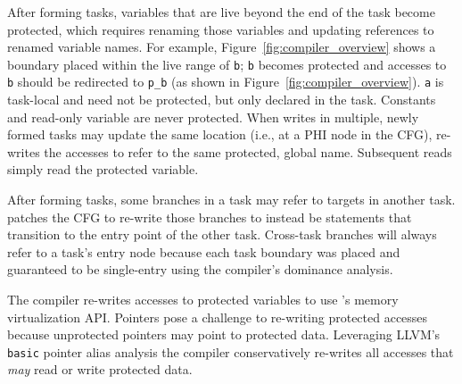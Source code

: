 After forming tasks, variables that are live beyond the end of the task become
protected, which requires renaming those variables and updating references to
renamed variable names. For example, Figure~\ref{fig:compiler_overview} shows a
boundary placed within the live range of {\tt b}; {\tt b} becomes protected and
accesses to {\tt b} should be redirected to {\tt p\_b} (as shown in
Figure~\ref{fig:compiler_overview}). {\tt a} is task-local and need not be
protected, but only declared in the task. Constants and read-only variable are
never protected. When writes in multiple, newly formed tasks may update the
same location (i.e., at a PHI node in the CFG), \sys re-writes the accesses to
refer to the same protected, global name. Subsequent reads simply read the
protected variable.

After forming tasks, some branches in a task may refer to targets in another
task. \sys patches the CFG to re-write those branches to instead be \transition
statements that transition to the entry point of the other task.  Cross-task
branches will always refer to a task's entry node because each task boundary
was placed and guaranteed to be single-entry using the compiler's dominance
analysis.

The compiler re-writes accesses to protected variables to use \sys's memory
virtualization API. Pointers pose a challenge to re-writing protected accesses
because unprotected pointers may point to protected data. Leveraging LLVM's
{\tt basic} pointer alias analysis the compiler conservatively re-writes all
accesses that {\em may} read or write protected data. 


